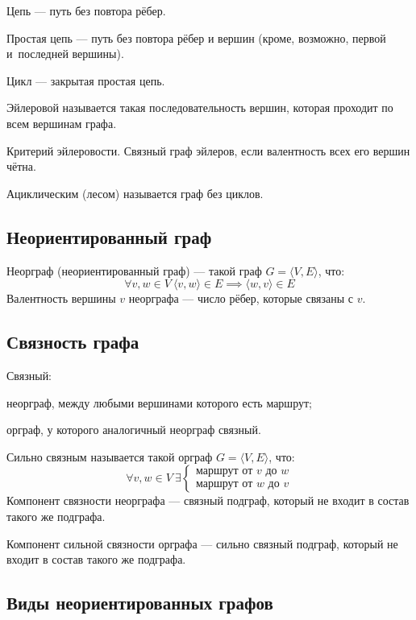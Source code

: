 {\bold Цепь} --- путь без повтора рёбер.

{\bold Простая цепь} --- путь без повтора рёбер и вершин {\ital\color{desc} (кроме, возможно, первой и~последней вершины)}.

{\bold Цикл} --- закрытая простая цепь.

{\bold Эйлеровой} называется такая последовательность вершин, которая проходит {\ital по всем} вершинам графа.
\begin{theorem}
{\bold Критерий эйлеровости.} Связный граф {\ital эйлеров}, если валентность всех его вершин чётна. 
\end{theorem}
{\bold Ациклическим {\ital (лесом)}} называется граф без циклов.

\subsection{Неориентированный граф}

{\bold Неорграф} {\ital (неориентированный граф)} --- такой граф $G=\langle V,E\rangle$, что:
$$\forall v,w\in V\ \langle v,w\rangle\in E\implies\langle w,v\rangle\in E$$
{\bold Валентность} вершины $v$ неорграфа --- число рёбер, которые связаны с $v$.

\subsection{Связность графа}

{\bold Связный:}
\begin{list*}
\item{\ital неорграф}, между любыми вершинами которого есть маршрут;
\item{\ital орграф}, у которого аналогичный неорграф {\ital связный}.
\end{list*}
{\bold Сильно связным} называется такой {\ital орграф} $G=\langle V,E\rangle$, что:
$$\forall v,w\in V\ \exists
\begin{cases}
\text{маршрут от }v\text{ до }w\\
\text{маршрут от }w\text{ до }v
\end{cases}$$
{\bold Компонент связности} {\ital неорграфа} --- связный подграф, который не входит в состав такого же подграфа.

{\bold Компонент сильной связности} {\ital орграфа} --- сильно связный подграф, который не входит в состав такого же подграфа.

\subsection{Виды неориентированных графов}

